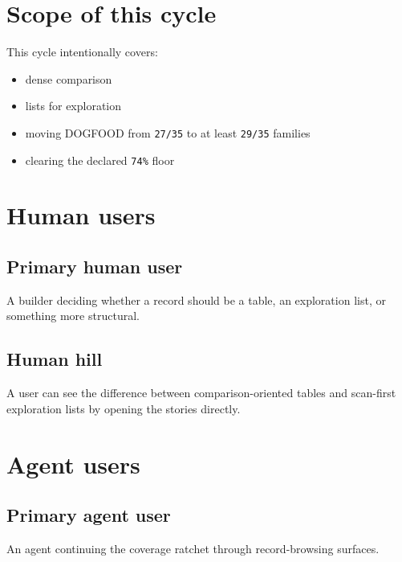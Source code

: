 \section{Scope of this cycle}\label{record-078-scope-of-this-cycle}

This cycle intentionally covers:

\begin{itemize}
\tightlist
\item
  dense comparison
\item
  lists for exploration
\item
  moving DOGFOOD from \texttt{2\allowbreak{}7\allowbreak{}/\allowbreak{}3\allowbreak{}5} to at least \texttt{2\allowbreak{}9\allowbreak{}/\allowbreak{}3\allowbreak{}5} families
\item
  clearing the declared \texttt{7\allowbreak{}4\allowbreak{}\%} floor
\end{itemize}

\section{Human users}\label{record-078-human-users}

\subsection{Primary human user}\label{record-078-primary-human-user}

A builder deciding whether a record should be a table, an exploration list, or something more structural.

\subsection{Human hill}\label{record-078-human-hill}

A user can see the difference between comparison-oriented tables and scan-first exploration lists by opening the stories directly.

\section{Agent users}\label{record-078-agent-users}

\subsection{Primary agent user}\label{record-078-primary-agent-user}

An agent continuing the coverage ratchet through record-browsing surfaces.

